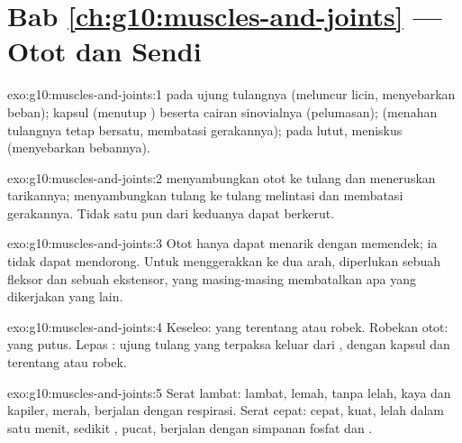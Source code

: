 \section*{Bab \ref{ch:g10:muscles-and-joints} --- Otot dan Sendi}

\begin{solution}{exo:g10:muscles-and-joints:1}
 pada ujung tulangnya (meluncur licin, menyebarkan beban);
kapsul (menutup ) beserta cairan sinovialnya (pelumasan);
 (menahan tulangnya tetap bersatu, membatasi gerakannya); pada
lutut, meniskus (menyebarkan bebannya).
\end{solution}

\begin{solution}{exo:g10:muscles-and-joints:2}
 menyambungkan otot ke tulang dan meneruskan tarikannya; 
menyambungkan tulang ke tulang melintasi  dan membatasi
gerakannya. Tidak satu pun dari keduanya dapat berkerut.
\end{solution}

\begin{solution}{exo:g10:muscles-and-joints:3}
Otot hanya dapat menarik dengan memendek; ia tidak dapat mendorong.
Untuk menggerakkan  ke dua arah, diperlukan sebuah fleksor dan
sebuah ekstensor, yang masing-masing membatalkan apa yang dikerjakan
yang lain.
\end{solution}

\begin{solution}{exo:g10:muscles-and-joints:4}
Keseleo:  yang terentang atau robek. Robekan otot: 
yang putus. Lepas : ujung tulang yang terpaksa keluar dari
, dengan kapsul dan  terentang atau robek.
\end{solution}

\begin{solution}{exo:g10:muscles-and-joints:5}
Serat lambat: lambat, lemah, tanpa lelah, kaya  dan kapiler,
merah, berjalan dengan respirasi. Serat cepat: cepat, kuat, lelah dalam
satu menit, sedikit , pucat, berjalan dengan simpanan fosfat
dan .
\end{solution}

